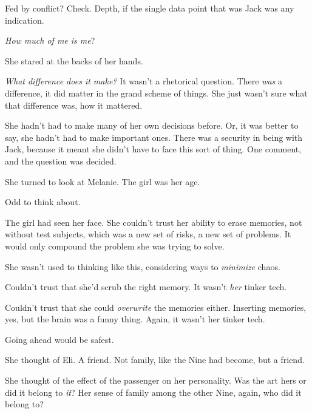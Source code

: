 Fed by conflict?  Check.  Depth, if the single data point that was Jack was any indication.



\emph{How much of me is me}?



She stared at the backs of her hands.



\emph{What difference does it make?  }It wasn't a rhetorical question.  There \emph{was} a difference, it did matter in the grand scheme of things.  She just wasn't sure what that difference was, how it mattered.



She hadn't had to make many of her own decisions before.  Or, it was better to say, she hadn't had to make important ones.  There was a security in being with Jack, because it meant she didn't have to face this sort of thing.  One comment, and the question was decided.



She turned to look at Melanie.  The girl was her age.



Odd to think about.



The girl had seen her face.  She couldn't trust her ability to erase memories, not without test subjects, which was a new set of risks, a new set of problems.  It would only compound the problem she was trying to solve.



She wasn't used to thinking like this, considering ways to \emph{minimize} chaos.



Couldn't trust that she'd scrub the right memory.  It wasn't \emph{her} tinker tech.



Couldn't trust that she could \emph{overwrite} the memories either.  Inserting memories, yes, but the brain was a funny thing.  Again, it wasn't her tinker tech.



Going ahead would be safest.



She thought of Eli.  A friend.  Not family, like the Nine had become, but a friend.



She thought of the effect of the passenger on her personality.  Was the art hers or did it belong to \emph{it}?  Her sense of family among the other Nine, again, who did it belong to?




